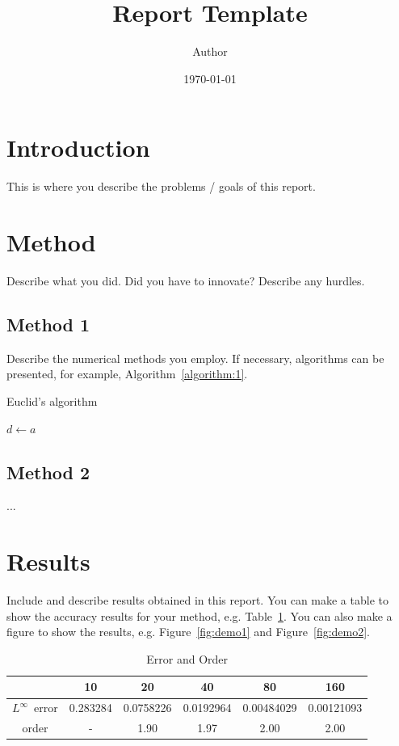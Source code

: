 \documentclass{article}
\title{Report Template}
\author{Author}
\date{\today}
\begin{document}
\maketitle

\section{Introduction}

This is where you describe the problems / goals of this report.

\section{Method}

Describe what you did. Did you have to innovate? Describe any
hurdles.

\subsection{Method 1}

Describe the numerical methods you employ.
If necessary, algorithms can be presented, for example, Algorithm~\ref{algorithm:1}.


\begin{algorithm}
    \caption{Euclid's algorithm}\label{algorithm:1}
    $d \leftarrow a$\;
\end{algorithm}

\subsection{Method 2}

...

\section{Results}

Include and describe results obtained in this report.
You can make a table to show the accuracy results for your
method, e.g. Table~\ref{tab:demo0}.
You can also make a figure to show the results, e.g. Figure~\ref{fig:demo1} and Figure~\ref{fig:demo2}.


\begin{table}[ht]
    \centering
    \caption{Error and Order}\label{tab:demo0}
    \begin{tabular}{c|ccccc}
        \hline
                           & 10       & 20        & 40        & 80         & 160        \\
        \hline
        $L^{\infty}$~error & 0.283284 & 0.0758226 & 0.0192964 & 0.00484029 & 0.00121093 \\
        order              & -        & 1.90      & 1.97      & 2.00       & 2.00       \\
        \hline
    \end{tabular}
\end{table}
\end{document}
